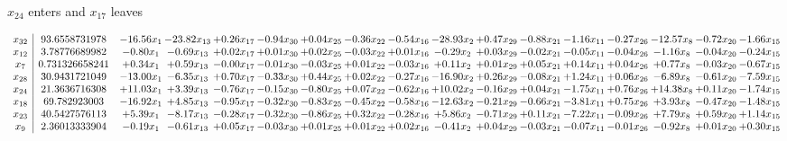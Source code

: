 \documentclass[9pt]{article}
\begin{document}
 $ x_{24} $ enters and $ x_{17} $ leaves 

 \[\begin{array}{c| c c@{\hskip 2pt} c@{\hskip 2pt} c@{\hskip 2pt} c@{\hskip 2pt} c@{\hskip 2pt} c@{\hskip 2pt} c@{\hskip 2pt} c@{\hskip 2pt} c@{\hskip 2pt} c@{\hskip 2pt} c@{\hskip 2pt} c@{\hskip 2pt} c@{\hskip 2pt} c@{\hskip 2pt} c@{\hskip 2pt} }
 x_{32}   &  93.6558731978 & -16.56 x_{1} & -23.82 x_{13} & +  0.26 x_{17} & -0.94 x_{30} & +  0.04 x_{25} & -0.36 x_{22} & -0.54 x_{16} & -28.93 x_{2} & +  0.47 x_{29} & -0.88 x_{21} & -1.16 x_{11} & -0.27 x_{26} & -12.57 x_{8} & -0.72 x_{20} & -1.66 x_{15}\\
 x_{12}   &  3.78776689982 & -0.80 x_{1} & -0.69 x_{13} & +  0.02 x_{17} & +  0.01 x_{30} & +  0.02 x_{25} & -0.03 x_{22} & +  0.01 x_{16} & -0.29 x_{2} & +  0.03 x_{29} & -0.02 x_{21} & -0.05 x_{11} & -0.04 x_{26} & -1.16 x_{8} & -0.04 x_{20} & -0.24 x_{15}\\
 x_{7}   &  0.731326658241 & +  0.34 x_{1} & +  0.59 x_{13} & -0.00 x_{17} & -0.01 x_{30} & -0.03 x_{25} & +  0.01 x_{22} & -0.03 x_{16} & +  0.11 x_{2} & +  0.01 x_{29} & +  0.05 x_{21} & +  0.14 x_{11} & +  0.04 x_{26} & +  0.77 x_{8} & -0.03 x_{20} & -0.67 x_{15}\\
 x_{28}   &  30.9431721049 & -13.00 x_{1} & -6.35 x_{13} & +  0.70 x_{17} & -0.33 x_{30} & +  0.44 x_{25} & +  0.02 x_{22} & -0.27 x_{16} & -16.90 x_{2} & +  0.26 x_{29} & -0.08 x_{21} & +  1.24 x_{11} & +  0.06 x_{26} & -6.89 x_{8} & -0.61 x_{20} & -7.59 x_{15}\\
 x_{24}   &  21.3636716308 & + 11.03 x_{1} & +  3.39 x_{13} & -0.76 x_{17} & -0.15 x_{30} & -0.80 x_{25} & +  0.07 x_{22} & -0.62 x_{16} & + 10.02 x_{2} & -0.16 x_{29} & +  0.04 x_{21} & -1.75 x_{11} & +  0.76 x_{26} & + 14.38 x_{8} & +  0.11 x_{20} & -1.74 x_{15}\\
 x_{18}   &  69.782923003 & -16.92 x_{1} & +  4.85 x_{13} & -0.95 x_{17} & -0.32 x_{30} & -0.83 x_{25} & -0.45 x_{22} & -0.58 x_{16} & -12.63 x_{2} & -0.21 x_{29} & -0.66 x_{21} & -3.81 x_{11} & +  0.75 x_{26} & +  3.93 x_{8} & -0.47 x_{20} & -1.48 x_{15}\\
 x_{23}   &  40.5427576113 & +  5.39 x_{1} & -8.17 x_{13} & -0.28 x_{17} & -0.32 x_{30} & -0.86 x_{25} & +  0.32 x_{22} & -0.28 x_{16} & +  5.86 x_{2} & -0.71 x_{29} & +  0.11 x_{21} & -7.22 x_{11} & -0.09 x_{26} & +  7.79 x_{8} & +  0.59 x_{20} & +  1.14 x_{15}\\
 x_{9}   &  2.36013333904 & -0.19 x_{1} & -0.61 x_{13} & +  0.05 x_{17} & -0.03 x_{30} & +  0.01 x_{25} & +  0.01 x_{22} & +  0.02 x_{16} & -0.41 x_{2} & +  0.04 x_{29} & -0.03 x_{21} & -0.07 x_{11} & -0.01 x_{26} & -0.92 x_{8} & +  0.01 x_{20} & +  0.30 x_{15}\\

\end{array}\]
\end{document}
